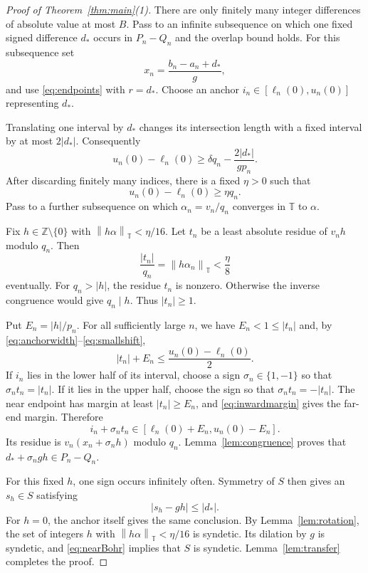 \documentclass[11pt,leqno]{amsart}
\numberwithin{equation}{section}
\theoremstyle{definition}
\theoremstyle{remark}
\newcommand{\Z}{\mathbb Z}
\newcommand{\T}{\mathbb T}
\newcommand{\normt}[1]{\left\|#1\right\|_{\T}}
\begin{document}
\begin{proof}[Proof of Theorem~\ref{thm:main}(1)]
There are only finitely many integer differences of absolute value at most $B$. Pass to an infinite subsequence on which one fixed signed difference $d_*$ occurs in $P_n-Q_n$ and the overlap bound holds. For this subsequence set
\[
x_n=\frac{b_n-a_n+d_*}{g},
\]
and use \eqref{eq:endpoints} with $r=d_*$. Choose an anchor $i_n\in[\ell_n(0),u_n(0)]$ representing $d_*$.

Translating one interval by $d_*$ changes its intersection length with a fixed interval by at most $2|d_*|$. Consequently
\[
u_n(0)-\ell_n(0)
\ge\delta q_n-\frac{2|d_*|}{gp_n}.
\]
After discarding finitely many indices, there is a fixed $\eta>0$ such that
\begin{equation}\label{eq:anchorwidth}
u_n(0)-\ell_n(0)\ge\eta q_n.
\end{equation}
Pass to a further subsequence on which $\alpha_n=v_n/q_n$ converges in $\T$ to $\alpha$.

Fix $h\in\Z\setminus\{0\}$ with $\normt{h\alpha}<\eta/16$. Let $t_n$ be a least absolute residue of $v_nh$ modulo $q_n$. Then
\begin{equation}\label{eq:smallshift}
\frac{|t_n|}{q_n}=\normt{h\alpha_n}<\frac{\eta}{8}
\end{equation}
eventually. For $q_n>|h|$, the residue $t_n$ is nonzero. Otherwise the inverse congruence would give $q_n\mid h$. Thus $|t_n|\ge1$.

Put $E_n=|h|/p_n$. For all sufficiently large $n$, we have $E_n<1\le|t_n|$ and, by \eqref{eq:anchorwidth}--\eqref{eq:smallshift},
\begin{equation}\label{eq:inwardmargin}
|t_n|+E_n\le\frac{u_n(0)-\ell_n(0)}2.
\end{equation}
If $i_n$ lies in the lower half of its interval, choose a sign $\sigma_n\in\{1,-1\}$ so that $\sigma_nt_n=|t_n|$. If it lies in the upper half, choose the sign so that $\sigma_nt_n=-|t_n|$. The near endpoint has margin at least $|t_n|\ge E_n$, and \eqref{eq:inwardmargin} gives the far-end margin. Therefore
\[
i_n+\sigma_nt_n\in[\ell_n(0)+E_n,u_n(0)-E_n].
\]
Its residue is $v_n(x_n+\sigma_nh)$ modulo $q_n$. Lemma~\ref{lem:congruence} proves that $d_*+\sigma_ngh\in P_n-Q_n$.

For this fixed $h$, one sign occurs infinitely often. Symmetry of $S$ then gives an $s_h\in S$ satisfying
\begin{equation}\label{eq:nearBohr}
|s_h-gh|\le|d_*|.
\end{equation}
For $h=0$, the anchor itself gives the same conclusion. By Lemma~\ref{lem:rotation}, the set of integers $h$ with $\normt{h\alpha}<\eta/16$ is syndetic. Its dilation by $g$ is syndetic, and \eqref{eq:nearBohr} implies that $S$ is syndetic. Lemma~\ref{lem:transfer} completes the proof.
\end{proof}
\end{document}
